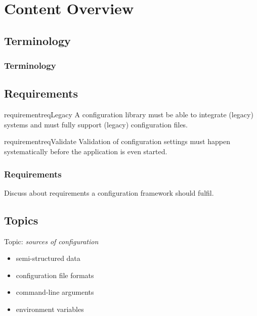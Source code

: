 \section{Content Overview}

\subsection{Terminology}
\begin{frame}
	\frametitle{Terminology}
	
\end{frame}

\subsection{Requirements}
\begin{frame}
\begin{restatable}{requirement}{reqLegacy}
A configuration library must be able to integrate (legacy) systems and must fully support (legacy) configuration files.%
\label{req:legacy}
\end{restatable}

\begin{restatable}{requirement}{reqValidate}
Validation of configuration settings must happen systematically before the application is even started.
\end{restatable}
\end{frame}

\begin{assignment}
	\frametitle{Requirements}
	\begin{task}
	Discuss about requirements a configuration framework should fulfil.
	\end{task}
\end{assignment}

\subsection{Topics}
\begin{frame}
	Topic: \textit{sources of configuration}
	\begin{itemize}
		\item semi-structured data
		\item configuration file formats
		\item command-line arguments
		\item environment variables
	\end{itemize}
\end{frame}

